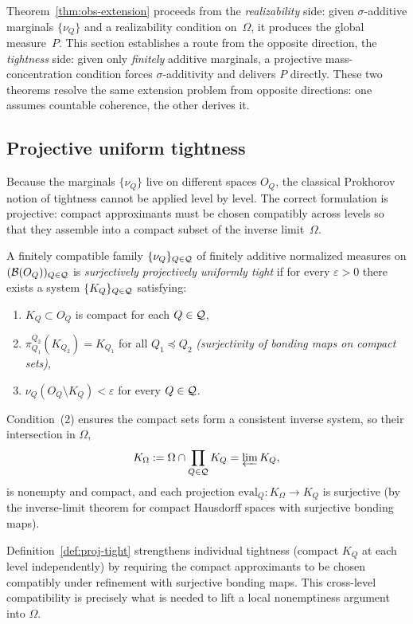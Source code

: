 Theorem~\ref{thm:obs-extension} proceeds from the \emph{realizability} side:
given $\sigma$-additive marginals $\{\nu_Q\}$ and a realizability
condition on~$\Omega$, it produces the global measure~$P$.
This section establishes a route from the opposite direction, the \emph{tightness} side:
given only \emph{finitely} additive marginals, a projective mass-concentration
condition forces $\sigma$-additivity and delivers $P$ directly.
These two theorems resolve the same extension problem from opposite directions:
one assumes countable coherence, the other derives it.

\subsection*{Projective uniform tightness}

Because the marginals $\{\nu_Q\}$ live on different spaces $O_Q$,
the classical Prokhorov notion of tightness cannot be applied
level by level.  The correct formulation is projective: compact
approximants must be chosen compatibly across levels so that they
assemble into a compact subset of the inverse limit~$\Omega$.

\begin{definition}
\label{def:proj-tight}
A finitely compatible family $\{\nu_Q\}_{Q\in\mathcal{Q}}$ of finitely
additive normalized measures on $(\mathcal{B}(O_Q))_{Q\in\mathcal{Q}}$
is \emph{surjectively projectively uniformly tight} if for every
$\varepsilon>0$ there exists a system $\{K_Q\}_{Q\in\mathcal{Q}}$ satisfying:
\begin{enumerate}
\item $K_Q\subset O_Q$ is compact for each $Q\in\mathcal{Q}$,
\item $\pi^{Q_2}_{Q_1}(K_{Q_2})=K_{Q_1}$ for all $Q_1\preceq Q_2$
      \emph{(surjectivity of bonding maps on compact sets)},
\item $\nu_Q(O_Q\setminus K_Q)<\varepsilon$ for every $Q\in\mathcal{Q}$.
\end{enumerate}
Condition~(2) ensures the compact sets form a consistent inverse system,
so their intersection in $\Omega$,
\[
K_\Omega := \Omega\cap\prod_{Q\in\mathcal{Q}} K_Q = \varprojlim K_Q,
\]
is nonempty and compact, and each projection
$\mathrm{eval}_Q:K_\Omega\to K_Q$ is surjective (by the
inverse-limit theorem for compact Hausdorff spaces with surjective
bonding maps).
\end{definition}

\begin{remark}
Definition~\ref{def:proj-tight} strengthens individual tightness
(compact $K_Q$ at each level independently) by requiring the compact
approximants to be chosen compatibly under refinement with surjective
bonding maps.  This cross-level compatibility is precisely what is
needed to lift a local nonemptiness argument into $\Omega$.
\end{remark}

